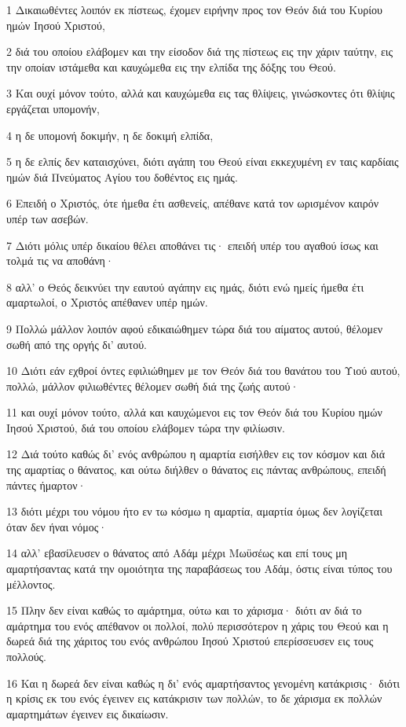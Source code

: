 \par 1 Δικαιωθέντες λοιπόν εκ πίστεως, έχομεν ειρήνην προς τον Θεόν διά του Κυρίου ημών Ιησού Χριστού,
\par 2 διά του οποίου ελάβομεν και την είσοδον διά της πίστεως εις την χάριν ταύτην, εις την οποίαν ιστάμεθα και καυχώμεθα εις την ελπίδα της δόξης του Θεού.
\par 3 Και ουχί μόνον τούτο, αλλά και καυχώμεθα εις τας θλίψεις, γινώσκοντες ότι θλίψις εργάζεται υπομονήν,
\par 4 η δε υπομονή δοκιμήν, η δε δοκιμή ελπίδα,
\par 5 η δε ελπίς δεν καταισχύνει, διότι αγάπη του Θεού είναι εκκεχυμένη εν ταις καρδίαις ημών διά Πνεύματος Αγίου του δοθέντος εις ημάς.
\par 6 Επειδή ο Χριστός, ότε ήμεθα έτι ασθενείς, απέθανε κατά τον ωρισμένον καιρόν υπέρ των ασεβών.
\par 7 Διότι μόλις υπέρ δικαίου θέλει αποθάνει τις· επειδή υπέρ του αγαθού ίσως και τολμά τις να αποθάνη·
\par 8 αλλ' ο Θεός δεικνύει την εαυτού αγάπην εις ημάς, διότι ενώ ημείς ήμεθα έτι αμαρτωλοί, ο Χριστός απέθανεν υπέρ ημών.
\par 9 Πολλώ μάλλον λοιπόν αφού εδικαιώθημεν τώρα διά του αίματος αυτού, θέλομεν σωθή από της οργής δι' αυτού.
\par 10 Διότι εάν εχθροί όντες εφιλιώθημεν με τον Θεόν διά του θανάτου του Υιού αυτού, πολλώ, μάλλον φιλιωθέντες θέλομεν σωθή διά της ζωής αυτού·
\par 11 και ουχί μόνον τούτο, αλλά και καυχώμενοι εις τον Θεόν διά του Κυρίου ημών Ιησού Χριστού, διά του οποίου ελάβομεν τώρα την φιλίωσιν.
\par 12 Διά τούτο καθώς δι' ενός ανθρώπου η αμαρτία εισήλθεν εις τον κόσμον και διά της αμαρτίας ο θάνατος, και ούτω διήλθεν ο θάνατος εις πάντας ανθρώπους, επειδή πάντες ήμαρτον·
\par 13 διότι μέχρι του νόμου ήτο εν τω κόσμω η αμαρτία, αμαρτία όμως δεν λογίζεται όταν δεν ήναι νόμος·
\par 14 αλλ' εβασίλευσεν ο θάνατος από Αδάμ μέχρι Μωϋσέως και επί τους μη αμαρτήσαντας κατά την ομοιότητα της παραβάσεως του Αδάμ, όστις είναι τύπος του μέλλοντος.
\par 15 Πλην δεν είναι καθώς το αμάρτημα, ούτω και το χάρισμα· διότι αν διά το αμάρτημα του ενός απέθανον οι πολλοί, πολύ περισσότερον η χάρις του Θεού και η δωρεά διά της χάριτος του ενός ανθρώπου Ιησού Χριστού επερίσσευσεν εις τους πολλούς.
\par 16 Και η δωρεά δεν είναι καθώς η δι' ενός αμαρτήσαντος γενομένη κατάκρισις· διότι η κρίσις εκ του ενός έγεινεν εις κατάκρισιν των πολλών, το δε χάρισμα εκ πολλών αμαρτημάτων έγεινεν εις δικαίωσιν.
